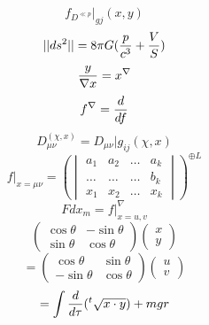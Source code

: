 \documentclass{jsarticle}
\begin{document}
  $$ f_{{D}^{\ll p}}|_{gj} (x,y) $$
  $$ ||ds^2|| = 8 \pi G({p \over c^3} + {V \over S}) $$
  $$ {y \over {\nabla x}} = x^{\nabla} $$
  $$ f^{\nabla} = {d \over {d f}} $$
  $$ D^{(\chi,x)}_{\mu\nu} = D_{\mu\nu}|g_{ij}(\chi,x) $$
  $$ f|_{x=\mu\nu} = {\left(\begin{vmatrix} a_1 & a_2 &\dots & a_k \\
	  \dots & \dots &  \dots & b_k \\
  x_1 & x_2 & \dots & x_k \end{vmatrix} \right)}^{\oplus L} $$
  $$ F dx_m = f|^{\nabla}_{x=u,v} $$
  $$ \begin{pmatrix} \cos \theta & -\sin \theta \\
  \sin \theta & \cos \theta \end{pmatrix} \begin{pmatrix} x \\
  y \end{pmatrix} $$
  $$ = \begin{pmatrix} \cos \theta & \sin \theta \\
  - \sin \theta & \cos \theta \end{pmatrix} \begin{pmatrix} u \\
  v \end{pmatrix} $$
  $$ = \int {d \over {d \tau}}{({}^{t}\sqrt{x\cdot y})} + mgr $$
\end{document}
